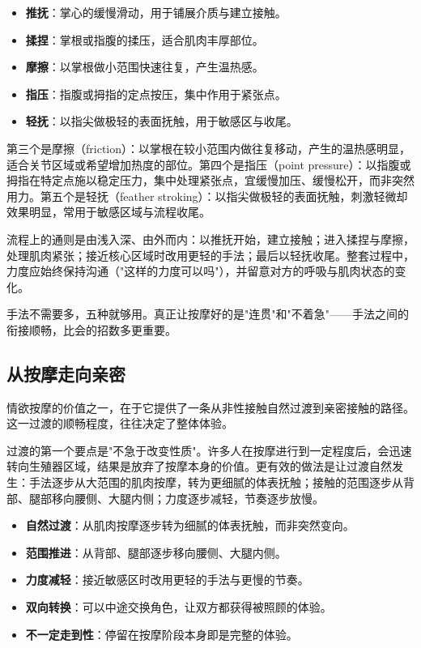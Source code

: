 \documentclass[12pt,UTF8]{ctexbook}
\newcommand{\keyword}[1]{\textbf{#1}}
\begin{document}
\begin{itemize}
  \item \keyword{推抚}：掌心的缓慢滑动，用于铺展介质与建立接触。
  \item \keyword{揉捏}：掌根或指腹的揉压，适合肌肉丰厚部位。
  \item \keyword{摩擦}：以掌根做小范围快速往复，产生温热感。
  \item \keyword{指压}：指腹或拇指的定点按压，集中作用于紧张点。
  \item \keyword{轻抚}：以指尖做极轻的表面抚触，用于敏感区与收尾。
\end{itemize}

第三个是摩擦（friction）：以掌根在较小范围内做往复移动，产生的温热感明显，适合关节区域或希望增加热度的部位。第四个是指压（point pressure）：以指腹或拇指在特定点施以稳定压力，集中处理紧张点，宜缓慢加压、缓慢松开，而非突然用力。第五个是轻抚（feather stroking）：以指尖做极轻的表面抚触，刺激轻微却效果明显，常用于敏感区域与流程收尾。

流程上的通则是由浅入深、由外而内：以推抚开始，建立接触；进入揉捏与摩擦，处理肌肉紧张；接近核心区域时改用更轻的手法；最后以轻抚收尾。整套过程中，力度应始终保持沟通（"这样的力度可以吗"），并留意对方的呼吸与肌肉状态的变化。

\begin{tcolorbox}[colback=pink!5!white,colframe=red!50!black,title=贴心小叮咛]
手法不需要多，五种就够用。真正让按摩好的是"连贯"和"不着急"——手法之间的衔接顺畅，比会的招数多更重要。
\end{tcolorbox}
\subsection{从按摩走向亲密}

情欲按摩的价值之一，在于它提供了一条从非性接触自然过渡到亲密接触的路径。这一过渡的顺畅程度，往往决定了整体体验。

过渡的第一个要点是"不急于改变性质"。许多人在按摩进行到一定程度后，会迅速转向生殖器区域，结果是放弃了按摩本身的价值。更有效的做法是让过渡自然发生：手法逐步从大范围的肌肉按摩，转为更细腻的体表抚触；接触的范围逐步从背部、腿部移向腰侧、大腿内侧；力度逐步减轻，节奏逐步放慢。

\begin{itemize}
  \item \keyword{自然过渡}：从肌肉按摩逐步转为细腻的体表抚触，而非突然变向。
  \item \keyword{范围推进}：从背部、腿部逐步移向腰侧、大腿内侧。
  \item \keyword{力度减轻}：接近敏感区时改用更轻的手法与更慢的节奏。
  \item \keyword{双向转换}：可以中途交换角色，让双方都获得被照顾的体验。
  \item \keyword{不一定走到性}：停留在按摩阶段本身即是完整的体验。
\end{itemize}
\end{document}
